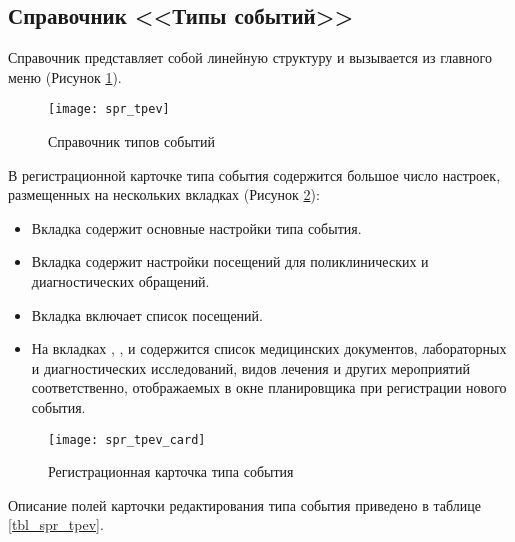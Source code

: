 \subsection{Справочник <<Типы событий>>}

Справочник представляет собой линейную структуру и вызывается из главного меню  (Рисунок \ref{img_spr_tpev}).

\begin{figure}[ht]\centering
 \texttt{[image: spr\_tpev]}
 \caption{Справочник типов событий}
 \label{img_spr_tpev}
\end{figure}

В регистрационной карточке типа события содержится большое число настроек, размещенных на нескольких вкладках (Рисунок \ref{img_spr_tpev_card}):
\begin{itemize}
 \item Вкладка  содержит основные настройки типа события.
 \item Вкладка  содержит настройки посещений для поликлинических и диагностических обращений.
 \item Вкладка  включает список посещений.
 \item На вкладках , ,  и  содержится список медицинских документов, лабораторных и диагностических исследований, видов лечения и других мероприятий соответственно, отображаемых в окне планировщика при регистрации нового события.
\end{itemize} 

\begin{figure}[ht]\centering
 \texttt{[image: spr\_tpev\_card]}
 \caption{Регистрационная карточка типа события}
 \label{img_spr_tpev_card}
\end{figure}

Описание полей карточки редактирования типа события приведено в таблице \ref{tbl_spr_tpev}.

